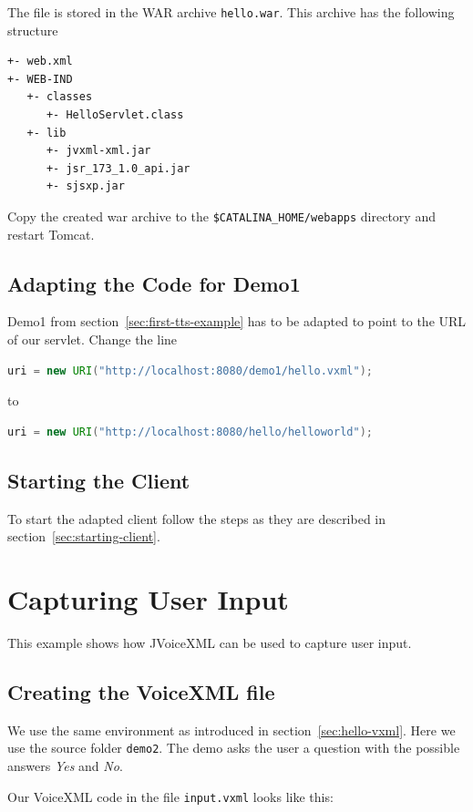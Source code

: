 \documentclass[11pt,a4paper]{book}
\begin{document}
The file is stored in the WAR archive \texttt{hello.war}. This archive has the
following structure
\begin{lstlisting}
+- web.xml
+- WEB-IND
   +- classes
      +- HelloServlet.class
   +- lib
      +- jvxml-xml.jar
      +- jsr_173_1.0_api.jar
      +- sjsxp.jar
\end{lstlisting}

Copy the created war archive to the \texttt{\$CATALINA\_HOME/webapps}
directory and restart Tomcat.

\subsection{Adapting the Code for Demo1}

Demo1 from section~\ref{sec:first-tts-example} has to be adapted to point to
the URL of our servlet. Change the line
\begin{lstlisting}[language=Java]
uri = new URI("http://localhost:8080/demo1/hello.vxml");
\end{lstlisting}
to
\begin{lstlisting}[language=Java]
uri = new URI("http://localhost:8080/hello/helloworld");
\end{lstlisting}

\subsection{Starting the Client}

To start the adapted client follow the steps as they are described in
section~\ref{sec:starting-client}.

\section{Capturing User Input}

This example shows how JVoiceXML can be used to capture user input. 

\subsection{Creating the VoiceXML file}

We use the same environment as introduced in section~\ref{sec:hello-vxml}. Here
we use the source folder \texttt{demo2}.
The demo asks the user a question with the possible answers
\emph{Yes} and \emph{No}.

Our VoiceXML code in the file \texttt{input.vxml} looks like this:
\end{document}
